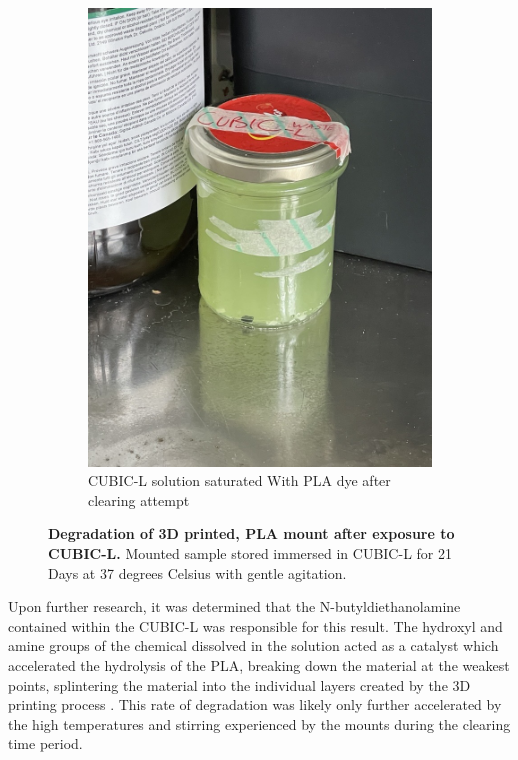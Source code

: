 \begin{figure}[H]
\begin{subfigure}[t]{0.4\textwidth}
    \includegraphics[width=1\linewidth]{Images/PLA_CUBIC_B.jpg}
    \caption{CUBIC-L solution saturated With PLA dye after clearing attempt}
    \end{subfigure}
    \medskip

\label{fig:enter-label}
\caption{\textbf{Degradation of 3D printed, PLA mount after exposure to CUBIC-L.} Mounted sample stored immersed in CUBIC-L for 21 Days at 37 degrees Celsius with gentle agitation.}
\end{figure}

Upon further research, it was determined that the N-butyldiethanolamine contained within the CUBIC-L was responsible for this result. The hydroxyl and amine groups of the chemical dissolved in the solution acted as a catalyst which accelerated the hydrolysis of the PLA, breaking down the material at the weakest points, splintering the material into the individual layers created by the 3D printing process \cite{elsawy_hydrolytic_2017}. This rate of degradation was likely only further accelerated by the high temperatures and stirring experienced by the mounts during the clearing time period. 

